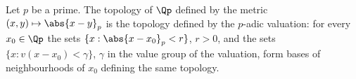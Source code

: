 Let $p$ be a prime. The topology of $\Qp$ defined by the metric $(x,y)\mapsto\abs{x-y}_p$ is the topology defined by the $p$-adic valuation: for every $x_0\in\Qp$ the sets $\{x:\abs{x-x_0}_p<r\}$, $r>0$, and the sets $\{x:v(x-x_0)<\gamma\}$, $\gamma$ in the value group of the valuation, form bases of neighbourhoods of $x_0$ defining the same topology.
